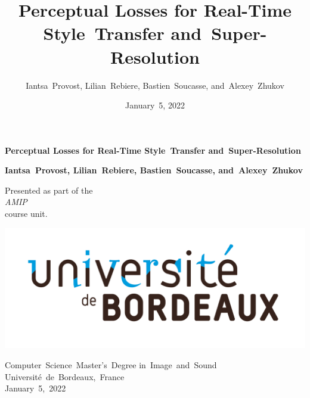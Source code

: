 \documentclass{article}
\title{Perceptual Losses for Real-Time Style~Transfer and~Super-Resolution}
\author{Iantsa~Provost, Lilian~Rebiere, Bastien~Soucasse, and~Alexey~Zhukov}
\date{January~5, 2022}
\begin{document}
{
    \begin{titlepage}
        \begin{center}
            \vspace*{1.5cm}
            
            \Large
            
            \textbf{Perceptual Losses for Real-Time Style~Transfer and~Super-Resolution}
            
            \vspace{.5cm}
            
            \vspace{1.5cm}
            
            \large
            
            \textbf{Iantsa~Provost, Lilian~Rebiere, Bastien~Soucasse, and~Alexey~Zhukov}
            
            \vfill
            
            \normalsize
            
            Presented as part of the\\
            \textit{AMIP}\\
            course unit.
            
            \vspace{1.5cm}
            
            \includegraphics[width=.5\textwidth]{images/college-logo.jpg}
            
            Computer~Science~Master's~Degree in~Image~and~Sound\\
            Université~de~Bordeaux,~France\\
            January~5,~2022
        \end{center}
    \end{titlepage}
    \newpage
    \setcounter{page}{2}
}

{
    \hypersetup{linkcolor=black}
    \tableofcontents
    \newpage
}
\end{document}
